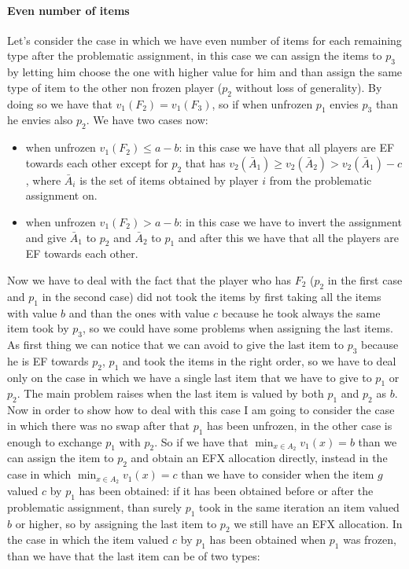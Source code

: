 \documentclass{article}
\begin{document}
\paragraph{Even number of items} Let's consider the case in which we have even number of items for each remaining type after the problematic assignment, in this case we can assign the items to $p_3$ by letting him choose the one with higher value for him and than assign the same type of item to the other non frozen player ($p_2$ without loss of generality). By doing so we have that $v_1(F_2) = v_1(F_3)$, so if when unfrozen $p_1$ envies $p_3$ than he envies also $p_2$. We have two cases now:
\begin{itemize}
\item when unfrozen $v_1(F_2) \le a-b$: in this case we have that all players are EF towards each other except for $p_2$ that has $v_2(\bar A_1) \ge v_2(\bar A_2)> v_2(\bar A_1) - c$, where $\bar A_i$ is the set of items obtained by player $i$ from the problematic assignment on.
\item when unfrozen $v_1(F_2) > a-b$: in this case we have to invert the assignment and give $\bar A_1$ to $p_2$ and $\bar A_2$ to $p_1$ and after this we have that all the players are EF towards each other.
\end{itemize}
Now we have to deal with the fact that the player who has $F_2$ ($p_2$ in the first case and $p_1$ in the second case) did not took the items by first taking all the items with value $b$ and than the ones with value $c$ because he took always the same item took by $p_3$, so we could have some problems when assigning the last items. As first thing we can notice that we can avoid to give the last item to $p_3$ because he is EF towards $p_2$, $p_1$  and took the items in the right order, so we have to deal only on the case in which we have a single last item that we have to give to $p_1$ or $p_2$. The main problem raises when the last item is valued by both $p_1$ and $p_2$ as $b$. Now in order to show how to deal with this case I am going to consider the case in which there was no swap after that $p_1$ has been unfrozen, in the other case is enough to exchange $p_1$ with $p_2$. So if we have that $\min_{x\in A_2} v_1(x) = b$ than we can assign the item to $p_2$ and obtain an EFX allocation directly, instead in the case in which $\min_{x\in A_2} v_1(x) = c$ than we have to consider when the item $g$ valued $c$ by $p_1$ has been obtained: if it has been obtained before or after the problematic assignment, than surely $p_1$ took in the same iteration an item valued $b$ or higher, so by assigning the last item to $p_2$ we still have an EFX allocation. In the case in which the item valued $c$ by $p_1$ has been obtained when $p_1$ was frozen, than we have that the last item can be of two types: 
\end{document}
